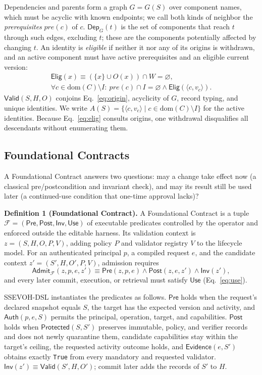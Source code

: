 \documentclass[letterpaper,journal]{IEEEtran}
\newcommand{\tool}{SSEVOH-DSL}
\newcommand{\vid}[2]{\ensuremath{\langle #1,#2\rangle}}
\begin{document}
Dependencies and parents form a graph $G=G(S)$ over component names, which must be acyclic with known endpoints; we call both kinds of neighbor the \emph{prerequisites} $\mathit{pre}(c)$ of $c$. $\mathsf{Dep}_G(t)$ is the set of components that reach $t$ through such edges, excluding $t$; these are the components potentially affected by changing $t$. An identity is \emph{eligible} if neither it nor any of its origins is withdrawn, and an active component must have active prerequisites and an eligible current version:
\begin{gather}
\mathsf{Elig}(x)\equiv(\{x\}\cup O(x))\cap W=\varnothing,\label{eq:elig}\\
\forall c\in\mathrm{dom}(C)\setminus I:\ \mathit{pre}(c)\cap I=\varnothing\wedge\mathsf{Elig}(\vid{c}{v_c}).\label{eq:origin}
\end{gather}
$\mathsf{Valid}(S,H,O)$ conjoins Eq.~\eqref{eq:origin}, acyclicity of $G$, record typing, and unique identities. We write $A(S)=\{\vid{c}{v_c}\mid c\in\mathrm{dom}(C)\setminus I\}$ for the active identities. Because Eq.~\eqref{eq:elig} consults origins, one withdrawal disqualifies all descendants without enumerating them.

\subsection{Foundational Contracts}\label{sec:foundational}
A Foundational Contract answers two questions: may a change take effect now (a classical pre/postcondition and invariant check), and may its result still be used later (a continued-use condition that one-time approval lacks)?

\textbf{Definition 1 (Foundational Contract).} A Foundational Contract is a tuple
$\mathcal{F}=(\mathsf{Pre},\mathsf{Post},\mathsf{Inv},\mathsf{Use})$
of executable predicates controlled by the operator and enforced outside the editable harness. Its validation context is $z=(S,H,O,P,V)$, adding policy $P$ and validator registry $V$ to the lifecycle model. For an authenticated principal $p$, a compiled request $e$, and the candidate context $z'=(S',H,O',P,V)$, admission requires
\begin{equation}
\mathsf{Admit}_{\mathcal F}(z,p,e,z')\equiv\mathsf{Pre}(z,p,e)\wedge\mathsf{Post}(z,e,z')\wedge\mathsf{Inv}(z'),
\label{eq:contract}
\end{equation}
and every later commit, execution, or retrieval must satisfy $\mathsf{Use}$ (Eq.~\eqref{eq:use}).

\tool{} instantiates the predicates as follows. $\mathsf{Pre}$ holds when the request's declared snapshot equals $S$, the target has the expected version and activity, and $\mathsf{Auth}(p,e,S)$ permits the principal, operation, target, and capabilities. $\mathsf{Post}$ holds when $\mathsf{Protected}(S,S')$ preserves immutable, policy, and verifier records and does not newly quarantine them, candidate capabilities stay within the target's ceiling, the requested activity outcome holds, and $\mathsf{Evidence}(e,S')$ obtains exactly \texttt{True} from every mandatory and requested validator. $\mathsf{Inv}(z')\equiv\mathsf{Valid}(S',H,O')$; commit later adds the records of $S'$ to $H$.
\end{document}
